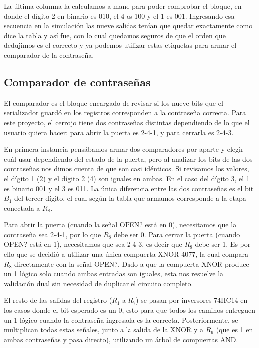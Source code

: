 \documentclass[12pt]{article}
\begin{document}
La última columna la calculamos a mano para poder comprobar el bloque, en donde el
dígito 2 en binario es 010, el 4 es 100 y el 1 es 001. Ingresando esa secuencia en
la simulación las nueve salidas tenían que quedar exactamente como dice la tabla y
así fue, con lo cual quedamos seguros de que el orden que dedujimos es el correcto
y ya podemos utilizar estas etiquetas para armar el comparador de la contraseña.

\subsection{Comparador de contraseñas}

El comparador es el bloque encargado de revisar si los nueve bits que el serializador guardó en los registros corresponden a la contraseña correcta. Para este proyecto, el cerrojo tiene dos contraseñas distintas dependiendo de lo que el usuario quiera hacer: para abrir la puerta es 2-4-1, y para cerrarla es 2-4-3.

En primera instancia pensábamos armar dos comparadores por aparte y elegir cuál usar dependiendo del estado de la puerta, pero al analizar los bits de las dos contraseñas nos dimos cuenta de que son casi idénticos. Si revisamos los valores, el dígito 1 (2) y el dígito 2 (4) son iguales en ambas. En el caso del dígito 3, el 1 es binario 001 y el 3 es 011. La única diferencia entre las dos contraseñas es el bit $B_1$ del tercer dígito, el cual según la tabla que armamos corresponde a la etapa conectada a $R_8$. 

Para abrir la puerta (cuando la señal OPEN? está en 0), necesitamos que la contraseña sea 2-4-1, por lo que $R_8$ debe ser 0. Para cerrar la puerta (cuando OPEN? está en 1), necesitamos que sea 2-4-3, es decir que $R_8$ debe ser 1. Es por ello que se decidió a utilizar una única compuerta XNOR 4077, la cual compara $R_8$ directamente con la señal OPEN?. Dado a que la compuerta XNOR produce un 1 lógico solo cuando ambas entradas son iguales, esta nos resuelve la validación dual sin necesidad de duplicar el circuito completo.

El resto de las salidas del registro ($R_1$ a $R_7$) se pasan por inversores 74HC14 en los casos donde el bit esperado es un 0, esto para que todos los caminos entreguen un 1 lógico cuando la contraseña ingresada es la correcta. Posteriormente, se multiplican todas estas señales, junto a la salida de la XNOR y a $R_9$ (que es 1 en ambas contraseñas y pasa directo), utilizando un árbol de compuertas AND. 
\end{document}

